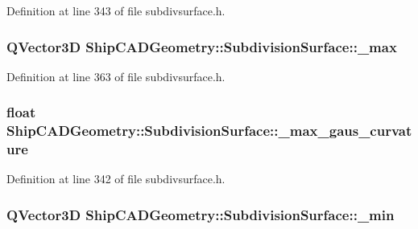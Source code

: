 Definition at line 343 of file subdivsurface.\-h.

\hypertarget{classShipCADGeometry_1_1SubdivisionSurface_ae206a579d516760512056460b9e0237c}{
\subsubsection[{\-\_\-max}]{\setlength{\rightskip}{0pt plus 5cm}Q\-Vector3\-D Ship\-C\-A\-D\-Geometry\-::\-Subdivision\-Surface\-::\-\_\-max\hspace{0.3cm}{\ttfamily [protected]}}}\label{classShipCADGeometry_1_1SubdivisionSurface_ae206a579d516760512056460b9e0237c}


Definition at line 363 of file subdivsurface.\-h.

\hypertarget{classShipCADGeometry_1_1SubdivisionSurface_afcea46c7f82ef5a320e8a70bdcb40eef}{
\subsubsection[{\-\_\-max\-\_\-gaus\-\_\-curvature}]{\setlength{\rightskip}{0pt plus 5cm}float Ship\-C\-A\-D\-Geometry\-::\-Subdivision\-Surface\-::\-\_\-max\-\_\-gaus\-\_\-curvature\hspace{0.3cm}{\ttfamily [protected]}}}\label{classShipCADGeometry_1_1SubdivisionSurface_afcea46c7f82ef5a320e8a70bdcb40eef}


Definition at line 342 of file subdivsurface.\-h.

\hypertarget{classShipCADGeometry_1_1SubdivisionSurface_a7318c1fbfeb1f0fbb8b2f445d607e4ef}{
\subsubsection[{\-\_\-min}]{\setlength{\rightskip}{0pt plus 5cm}Q\-Vector3\-D Ship\-C\-A\-D\-Geometry\-::\-Subdivision\-Surface\-::\-\_\-min\hspace{0.3cm}{\ttfamily [protected]}}}\label{classShipCADGeometry_1_1SubdivisionSurface_a7318c1fbfeb1f0fbb8b2f445d607e4ef}


